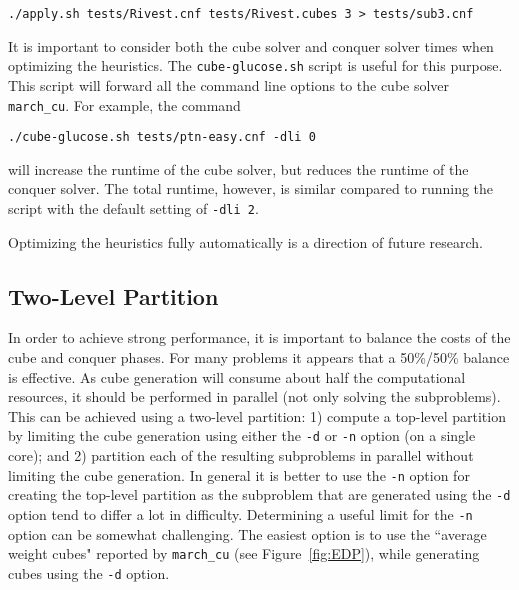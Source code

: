 \documentclass{llncs}
\begin{document}
\begin{verbatim}
./apply.sh tests/Rivest.cnf tests/Rivest.cubes 3 > tests/sub3.cnf
\end{verbatim}

It is important to consider both the cube solver and conquer solver times when optimizing the heuristics. 
The {\tt cube-glucose.sh} script is useful for this purpose. This script will forward all the command line
options to the cube solver {\tt march\_cu}. For example, the command 
%
\begin{verbatim}
./cube-glucose.sh tests/ptn-easy.cnf -dli 0
\end{verbatim}
%
will increase the runtime of the cube solver, but reduces the runtime of the conquer solver. The total
runtime, however, is similar compared to running the script with the default setting of {\tt -dli 2}.

Optimizing the heuristics fully automatically is a direction of future research.


\subsection{Two-Level Partition}
\label{sec:two-level}

In order to achieve strong performance, it is important to balance the costs of the cube and conquer phases. For many problems
it appears that a 50\%/50\% balance is effective. As cube generation will consume about half the computational resources, it should be performed in parallel (not only solving
the subproblems). This can be achieved using a two-level partition: 1) compute a top-level partition by limiting the cube 
generation using either the {\tt -d} or {\tt -n} option (on a single core); and 2) partition each of the resulting subproblems in parallel without
limiting the cube generation. In general it is better to use the {\tt -n} option for creating the top-level partition as the subproblem
that are generated using the {\tt -d} option tend to differ a lot in difficulty. Determining a useful limit for the {\tt -n} option can be somewhat challenging. 
The easiest option is to use the ``average weight cubes" reported by {\tt march\_cu} (see Figure~\ref{fig:EDP}), while generating cubes
using the {\tt -d} option.
\end{document}
